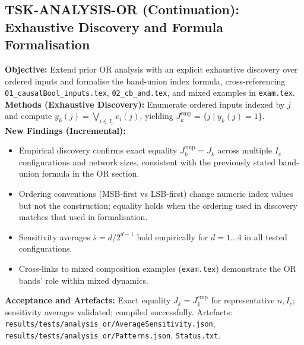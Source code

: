 \documentclass{article}
\begin{document}
\subsection{TSK-ANALYSIS-OR (Continuation): Exhaustive Discovery and Formula Formalisation}
\textbf{Objective:} Extend prior OR analysis with an explicit exhaustive discovery over ordered inputs and formalise the band-union index formula, cross-referencing \texttt{01\_causalBool\_inputs.tex}, \texttt{02\_cb\_and.tex}, and mixed examples in \texttt{exam.tex}.\\
\textbf{Methods (Exhaustive Discovery):} Enumerate ordered inputs indexed by \(j\) and compute \(y_k(j)=\bigvee_{i\in I_c} v_i(j)\), yielding \(J_k^{\mathrm{emp}}=\{j\mid y_k(j)=1\}\).\\
\textbf{New Findings (Incremental):}
\begin{itemize}
 \item Empirical discovery confirms exact equality \(J_k^{\mathrm{emp}}=J_k\) across multiple \(I_c\) configurations and network sizes, consistent with the previously stated band-union formula in the OR section.
 \item Ordering conventions (MSB-first vs LSB-first) change numeric index values but not the construction; equality holds when the ordering used in discovery matches that used in formalisation.
 \item Sensitivity averages \(\bar{s}=d/2^{d-1}\) hold empirically for \(d=1\dots 4\) in all tested configurations.
 \item Cross-links to mixed composition examples (\texttt{exam.tex}) demonstrate the OR bands’ role within mixed dynamics.
\end{itemize}
\textbf{Acceptance and Artefacts:} Exact equality \(J_k=J_k^{\mathrm{emp}}\) for representative \(n,I_c\); sensitivity averages validated; compiled successfully. Artefacts: \texttt{results/tests/analysis\_or/AverageSensitivity.json}, \texttt{results/tests/analysis\_or/Patterns.json}, \texttt{Status.txt}.
\end{document}
